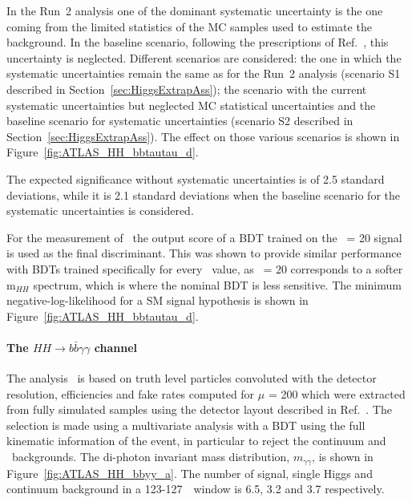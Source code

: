 In the Run~2 analysis one of the dominant systematic uncertainty is the one coming from the limited statistics of the MC samples used to estimate the background. In the baseline scenario, following the prescriptions of Ref.~\cite{ATLASperfPUBnote}, this uncertainty is neglected.
Different scenarios are considered: the one in which the systematic uncertainties remain the same as for the Run~2 analysis (scenario S1 described in Section~\ref{sec:HiggsExtrapAss}); the scenario with the current systematic uncertainties but neglected MC statistical uncertainties and the baseline scenario for systematic uncertainties (scenario S2 described in Section~\ref{sec:HiggsExtrapAss}). The effect on those various scenarios is shown in Figure~\ref{fig:ATLAS_HH_bbtautau_d}.

The expected significance without systematic uncertainties is of 2.5 standard deviations, while it is 2.1 standard deviations when the baseline scenario for the systematic uncertainties is considered.

For the measurement of \kl\ the output score of a BDT trained on the \kl\ = 20 signal is used as the final discriminant. This was shown to provide similar performance with BDTs trained specifically for every \kl\ value, as \kl\ = 20 corresponds to a softer m$_{HH}$ spectrum, which is where the nominal BDT is less sensitive.
The minimum negative-log-likelihood for a SM signal hypothesis is shown in Figure~\ref{fig:ATLAS_HH_bbtautau_d}.




%
\paragraph{The $HH \rightarrow b\bar{b}\gamma\gamma$ channel}


The analysis~\cite{ATLASHHPUBnote} is based on truth level particles convoluted with the detector resolution, efficiencies and fake rates computed for $\mu$ = 200 which were extracted from fully simulated samples using the detector layout described in Ref.~\cite{ITKPixelTDR}. The selection is made using a multivariate analysis with a BDT using the full kinematic information of the event, in particular to reject the continuum and \ttH\ backgrounds. 
The di-photon invariant mass distribution, $\ensuremath{m_{\gamma\gamma}}$, is shown in Figure~\ref{fig:ATLAS_HH_bbyy_a}. The number of signal, single Higgs and continuum background in a 123-127~\GeV\ window is 6.5, 3.2 and 3.7 respectively.

